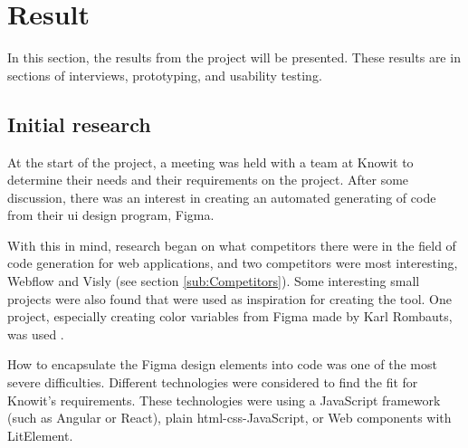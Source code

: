 \section{Result}


In this section, the results from the project will be presented. These results are in sections of interviews, prototyping, and usability testing.

\subsection{Initial research}
\label{sub:Initial research}

At the start of the project, a meeting was held with a team at Knowit to determine their needs and their requirements on the project. After some discussion, there was an interest in creating an automated generating of code from their \acrshort{ui} design program, Figma. 

With this in mind, research began on what competitors there were in the field of code generation for web applications, and two competitors were most interesting, Webflow and Visly (see section \ref{sub:Competitors}). Some interesting small projects were also found that were used as inspiration for creating the tool. One project, especially creating color variables from Figma made by Karl Rombauts, was used \cite{rombautsKarlRombautsFigmaSCSSGenerator2021}.

How to encapsulate the Figma design elements into code was one of the most severe difficulties.  Different technologies were considered to find the fit for Knowit's requirements.  These technologies were using a JavaScript framework (such as Angular or React), plain \acrshort{html}-\acrshort{css}-JavaScript, or Web \glspl{component} with LitElement. 

